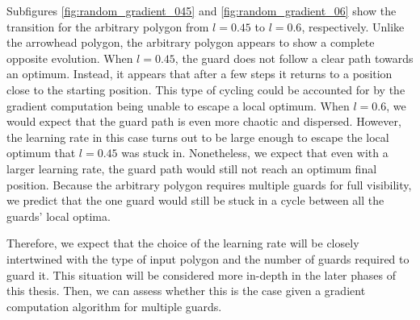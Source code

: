 Subfigures \ref{fig:random_gradient_045} and \ref{fig:random_gradient_06} show the transition for the arbitrary polygon from $l = 0.45$ to $l = 0.6$, respectively. Unlike the arrowhead polygon, the arbitrary polygon appears to show a complete opposite evolution. When $l = 0.45$, the guard does not follow a clear path towards an optimum. Instead, it appears that after a few steps it returns to a position close to the starting position. This type of cycling could be accounted for by the gradient computation being unable to escape a local optimum. When $l = 0.6$, we would expect that the guard path is even more chaotic and dispersed. However, the learning rate in this case turns out to be large enough to escape the local optimum that $l = 0.45$ was stuck in. Nonetheless, we expect that even with a larger learning rate, the guard path would still not reach an optimum final position. Because the arbitrary polygon requires multiple guards for full visibility, we predict that the one guard would still be stuck in a cycle between all the guards' local optima.

Therefore, we expect that the choice of the learning rate will be closely intertwined with the type of input polygon and the number of guards required to guard it. This situation will be considered more in-depth in the later phases of this thesis. Then, we can assess whether this is the case given a gradient computation algorithm for multiple guards.